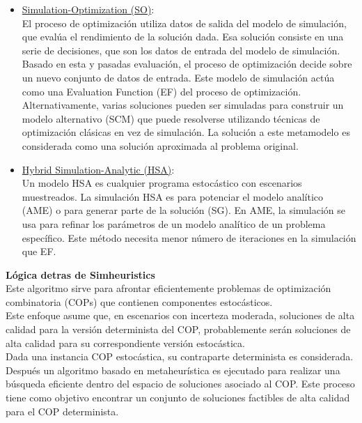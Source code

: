 \documentclass[11pt]{article} %
\begin{document}
\begin{itemize}
\item \underline{Simulation-Optimization (SO)}:\\[0.2cm]
El proceso de optimización utiliza datos de salida del modelo de simulación, que evalúa el rendimiento de la solución dada. Esa solución consiste en una serie de decisiones, que son los datos de entrada del modelo de simulación. Basado en esta y pasadas evaluación, el proceso de optimización decide sobre un nuevo conjunto de datos de entrada. Este modelo de simulación actúa como una Evaluation Function (EF)  del proceso de optimización.
Alternativamente, varias soluciones pueden ser simuladas para construir un modelo alternativo (SCM) que puede resolverse utilizando técnicas de optimización clásicas en vez de simulación. La solución a este metamodelo es considerada como una solución aproximada al problema original.
\item \underline{Hybrid Simulation-Analytic (HSA)}:\\[0.2cm]
Un modelo HSA es cualquier programa estocástico con escenarios muestreados. La simulación HSA es para potenciar el modelo analítico (AME) o para generar parte de la solución (SG).
En AME, la simulación se usa para refinar los parámetros de un modelo analítico de un problema específico. Este método necesita menor número de iteraciones en la simulación que EF.
\end{itemize}

\textbf{Lógica detras de Simheuristics}\\[0.1cm]

Este algoritmo sirve para afrontar eficientemente problemas de optimización combinatoria (COPs) que contienen componentes estocásticos. \\[0.1cm]

Este enfoque asume que, en escenarios con incerteza moderada, soluciones de alta calidad para la versión determinista del COP, probablemente serán soluciones de alta calidad para su correspondiente versión estocástica.\\[0.1cm]

Dada una instancia COP estocástica, su contraparte determinista es considerada. Después un algoritmo basado en metaheurística es ejecutado para realizar una búsqueda eficiente dentro del espacio de soluciones asociado al COP. Este proceso tiene como objetivo encontrar un conjunto de soluciones factibles de alta calidad para el COP determinista.\\[0.1cm]
\end{document}
